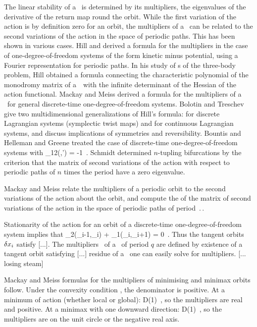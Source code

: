 The linear stability of a \po\ is determined by its multipliers, the eigenvalues
of the derivative of the return map round the orbit. While the first variation of
the action is by definition zero for an orbit, the multipliers of a \po\ can be
related to the second variations of the action in the space of periodic paths.
This has been shown in various cases. Hill and \Poincare{}
derived a formula for the multipliers in the case of one-degree-of-freedom
systems of the form kinetic minus potential, using a Fourier
representation for periodic paths. In his study of \po s of the three-body
problem, Hill obtained a formula connecting the characteristic polynomial of the
monodromy matrix of a \po\ with the infinite determinant of the Hessian of the
action functional. Mackay and Meiss derived a formula
 for the multipliers of a \po\ for general discrete-time
one-degree-of-freedom systems. Bolotin and Treschev give two
multidimensional generalizations of Hill's formula: for discrete Lagrangian
systems (symplectic twist maps) and for continuous Lagrangian systems, and
discuss implications of symmetries and reversibility. Bountis and
Helleman and Greene treated the case of discrete-time
one-degree-of-freedom systems with
\beq
\genF_{12}(\coord,\coord') = -1
\,.
Schmidt determined $n$-tupling bifurcations by the criterion
that the matrix of second variations of the action
with respect to periodic paths of $n$ times the period
have a zero eigenvalue.


Mackay and Meiss relate the multipliers of a periodic orbit to the second variations of
the action about the orbit, and compute the {\HillDet} of the matrix
of second variations of the action in the space of periodic
paths of period $\period{}$.

Stationarity  of the action for an orbit of a
discrete-time one-degree-of-freedom system implies that
\beq
\genF_2(\coord_{i-1},\coord_{i}) + \genF_1(\coord_i,\coord_{i+1}) = 0
\,.
Thus the tangent orbits $\delta x_i$ satisfy [...]. The multipliers
\ExpaEig\ of a \po\ of period $q$ are
defined by existence of a tangent orbit satisfying [...] residue of a \po\
one can easily solve for multipliers. [... losing steam]


Mackay and Meiss formulas for the multipliers of minimising and
minimax orbits follow. Under the convexity condition
, the denominator is positive. At a minimum of action
(whether local or global):
\beq
D(1) 
\,,
so the multipliers are real and positive. At a minimax with one downward
direction:
\beq
D(1) 
\,,
so the multipliers are on the unit circle or the negative real axis.

